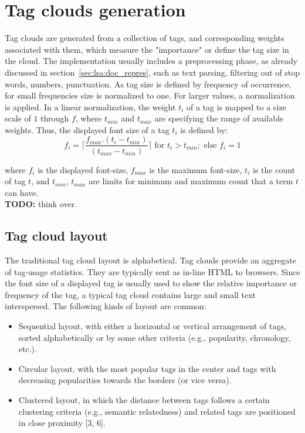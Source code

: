 \section{Tag clouds generation}
Tag clouds are generated from a collection of tags, and corresponding weights associated with them, which measure the "importance" or define the tag size in the cloud. The implementation usually includes a preprocessing phase, as already discussed in section~\ref{sec:lsa:doc_repres}, such as text parsing, filtering out of stop words, numbers, punctuation. As tag size is defined by frequency of occurrence, for small frequencies size is normalized to one. For larger values, a normalization is applied. In a linear normalization, the weight $t_{i}$ of a tag is mapped to a size scale of $1$ through $f$, where $t_{min}$ and $t_{max}$ are specifying the range of available weights. Thus, the displayed font size of a tag $t_{i}$ is defined by: \\
\begin{equation}
f_{i} = \lceil {\frac{f_{max} . (t_{i} - t_{min})}{(t_{max} - t_{min})} }\rceil \mbox{ for }  t_{i} > t_{min}; \mbox{ else }  f_{i} = 1
\end{equation}

where $f_{i}$ is the displayed font-size, $f_{max}$ is the maximum font-size, $t_{i}$ is the count of tag $t$, and $t_{min}$, $t_{max}$ are limits for minimum and maximum count that a term $t$ can have. \\

\textbf{TODO:} think over.

\subsection{Tag cloud layout}
The traditional tag cloud layout is alphabetical. Tag clouds provide an aggregate of tag-usage statistics. They are typically sent as in-line HTML to browsers. Since the font size of a displayed tag is usually used to show the relative importance or frequency of the tag, a typical tag cloud contains large and small text interspersed. The following kinds of layout are common: \\

\begin{itemize}
\item Sequential layout, with either a horizontal or vertical arrangement of tags, sorted
alphabetically or by some other criteria (e.g., popularity, chronology, etc.).

\item Circular layout, with the most popular tags in the center and tags with decreasing
popularities towards the borders (or vice versa).
 
\item Clustered layout, in which the distance between tags follows a certain clustering
criteria (e.g., semantic relatedness) and related tags are positioned in close
proximity [3, 6].
\end{itemize}



